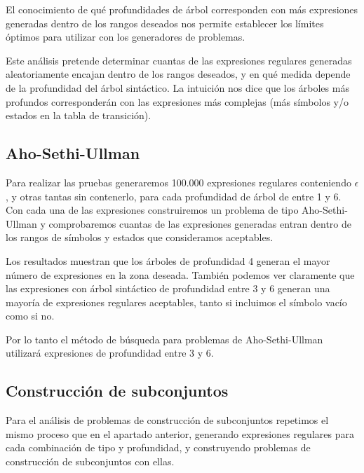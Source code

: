 El conocimiento de qué profundidades de árbol corresponden con más expresiones generadas dentro de los rangos deseados nos permite establecer los límites óptimos para utilizar con los generadores de problemas.

Este análisis pretende determinar cuantas de las expresiones regulares generadas aleatoriamente encajan dentro de los rangos deseados, y en qué medida depende de la profundidad del árbol sintáctico.
La intuición nos dice que los árboles más profundos corresponderán con las expresiones más complejas (más símbolos y/o estados en la tabla de transición).

\subsection{Aho-Sethi-Ullman}

Para realizar las pruebas generaremos 100.000 expresiones regulares conteniendo $ \epsilon $, y otras tantas sin contenerlo, para cada profundidad de árbol de entre 1 y 6.
Con cada una de las expresiones construiremos un problema de tipo Aho-Sethi-Ullman y comprobaremos cuantas de las expresiones generadas entran dentro de los rangos de símbolos y estados que consideramos aceptables.


Los resultados muestran que los árboles de profundidad 4 generan el mayor número de expresiones en la zona deseada.
También podemos ver claramente que las expresiones con árbol sintáctico de profundidad entre 3 y 6 generan una mayoría de expresiones regulares aceptables, tanto si incluimos el símbolo vacío como si no.

Por lo tanto el método de búsqueda para problemas de Aho-Sethi-Ullman utilizará expresiones de profundidad entre 3 y 6.

\subsection{Construcción de subconjuntos}

Para el análisis de problemas de construcción de subconjuntos repetimos el mismo proceso que en el apartado anterior, generando expresiones regulares para cada combinación de tipo y profundidad, y construyendo problemas de construcción de subconjuntos con ellas.


